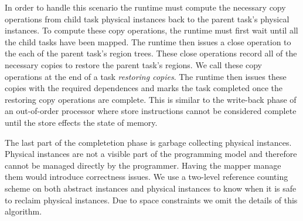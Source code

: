 In order to handle this scenario the runtime must compute the necessary copy operations
from child task physical instances back to the parent task's physical instances.  To
compute these copy operations, the runtime must first wait until all the child tasks
have been mapped.  The runtime then issues a close operation to the each of the parent
task's region trees.  These close operations record all of the necessary copies to
restore the parent task's regions.  We call these copy operations at the end of 
a task {\em restoring copies}.
The runtime then issues these copies with the required dependences
and marks the task completed once the restoring copy operations are complete.
This is similar to the write-back phase of an out-of-order processor where store instructions cannot be
considered complete until the store effects the state of memory.

The last part of the completetion phase is garbage collecting physical instances.  Physical
instances are not a visible part of the programming model and therefore cannot be managed
directly by the programmer.  Having the mapper manage them would introduce correctness
issues.  We use a two-level reference counting scheme on both abstract instances and physical
instances to know when it is safe to reclaim physical instances.  Due to space constraints
we omit the details of this algorithm. 




